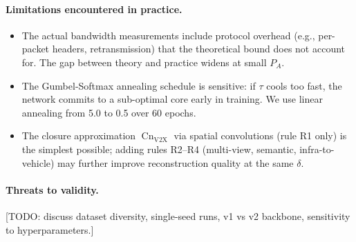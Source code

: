 \paragraph{Limitations encountered in practice.}
\begin{itemize}
    \item The actual bandwidth measurements include protocol overhead
          (e.g., per-packet headers, retransmission) that the theoretical
          bound does not account for. The gap between theory and practice
          widens at small $P_A$.
    \item The Gumbel-Softmax annealing schedule is sensitive: if $\tau$ cools
          too fast, the network commits to a sub-optimal core early in
          training. We use linear annealing from 5.0 to 0.5 over 60 epochs.
    \item The closure approximation $\operatorname{Cn}_{\mathrm{V2X}}$ via
          spatial convolutions (rule R1 only) is the simplest possible;
          adding rules R2--R4 (multi-view, semantic, infra-to-vehicle)
          may further improve reconstruction quality at the same $\delta$.
\end{itemize}

\paragraph{Threats to validity.}
[TODO: discuss dataset diversity, single-seed runs, v1 vs v2 backbone,
sensitivity to hyperparameters.]

